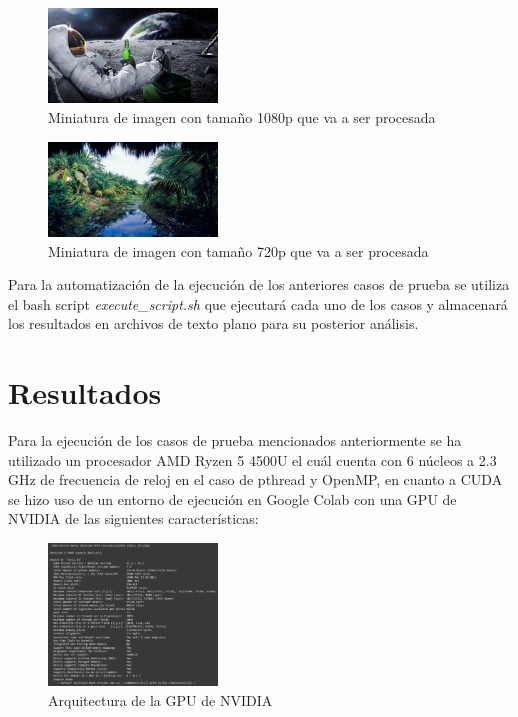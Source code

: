 \begin{figure}[H]
    \centering
    \includegraphics[width=0.4\textwidth]{../plots/1080p.jpg}
    \caption{Miniatura de imagen con tamaño 1080p que va a ser procesada}
\end{figure}

\begin{figure}[H]
    \centering
    \includegraphics[width=0.4\textwidth]{../plots/720p.jpg}
    \caption{Miniatura de imagen con tamaño 720p que va a ser procesada}
\end{figure}

Para la automatización de la ejecución de los anteriores casos de prueba se utiliza el bash script \textit{execute\_script.sh} que ejecutará cada uno de los casos y almacenará los resultados en archivos de texto plano para su posterior análisis.

\section{Resultados}

Para la ejecución de los casos de prueba mencionados anteriormente se ha utilizado un procesador AMD Ryzen 5 4500U el cuál cuenta con 6 núcleos a 2.3 GHz de frecuencia de reloj en el caso de pthread y OpenMP, en cuanto a CUDA se hizo uso de un entorno de ejecución en Google Colab con una GPU de NVIDIA de las siguientes características:

\begin{figure}[H]
    \centering
    \includegraphics[width=0.4\textwidth]{../plots/gpu_architecture.PNG}
    \caption{Arquitectura de la GPU de NVIDIA}
\end{figure}

